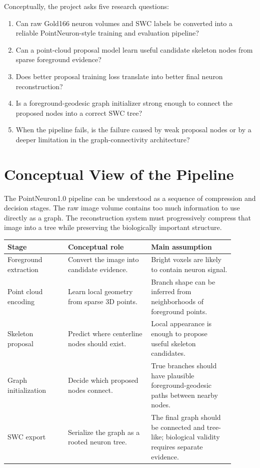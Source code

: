 \documentclass[11pt]{article}
\begin{document}
Conceptually, the project asks five research questions:

\begin{enumerate}
  \item Can raw Gold166 neuron volumes and SWC labels be converted into a
  reliable PointNeuron-style training and evaluation pipeline?
  \item Can a point-cloud proposal model learn useful candidate skeleton nodes
  from sparse foreground evidence?
  \item Does better proposal training loss translate into better final neuron
  reconstruction?
  \item Is a foreground-geodesic graph initializer strong enough to connect the
  proposed nodes into a correct SWC tree?
  \item When the pipeline fails, is the failure caused by weak proposal nodes or
  by a deeper limitation in the graph-connectivity architecture?
\end{enumerate}

\section{Conceptual View of the Pipeline}

The PointNeuron1.0 pipeline can be understood as a sequence of compression and
decision stages. The raw image volume contains too much information to use
directly as a graph. The reconstruction system must progressively compress that
image into a tree while preserving the biologically important structure.

\begin{center}
\begin{tabular}{p{0.24\linewidth}p{0.33\linewidth}p{0.33\linewidth}}
\toprule
Stage & Conceptual role & Main assumption \\
\midrule
Foreground extraction & Convert the image into candidate evidence. & Bright
voxels are likely to contain neuron signal. \\
Point cloud encoding & Learn local geometry from sparse 3D points. & Branch
shape can be inferred from neighborhoods of foreground points. \\
Skeleton proposal & Predict where centerline nodes should exist. & Local
appearance is enough to propose useful skeleton candidates. \\
Graph initialization & Decide which proposed nodes connect. & True branches
should have plausible foreground-geodesic paths between nearby nodes. \\
SWC export & Serialize the graph as a rooted neuron tree. & The final graph
should be connected and tree-like; biological validity requires separate evidence. \\
\bottomrule
\end{tabular}
\end{center}
\end{document}
